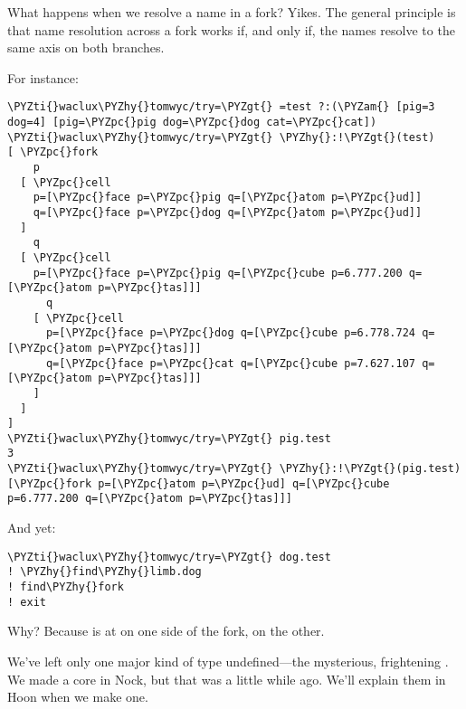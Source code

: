 What happens when we resolve a name in a fork?  Yikes.  The
general principle is that name resolution across a fork works if,
and only if, the names resolve to the same axis on both branches.

For instance:

\begin{framed_shaded}
\begin{Verbatim}[fontsize=\relsize{-2.5},fontseries=b,commandchars=\\\{\}]
\PYZti{}waclux\PYZhy{}tomwyc/try=\PYZgt{} =test ?:(\PYZam{} [pig=3 dog=4] [pig=\PYZpc{}pig dog=\PYZpc{}dog cat=\PYZpc{}cat])
\PYZti{}waclux\PYZhy{}tomwyc/try=\PYZgt{} \PYZhy{}:!\PYZgt{}(test)
[ \PYZpc{}fork
    p
  [ \PYZpc{}cell
    p=[\PYZpc{}face p=\PYZpc{}pig q=[\PYZpc{}atom p=\PYZpc{}ud]]
    q=[\PYZpc{}face p=\PYZpc{}dog q=[\PYZpc{}atom p=\PYZpc{}ud]]
  ]
    q
  [ \PYZpc{}cell
    p=[\PYZpc{}face p=\PYZpc{}pig q=[\PYZpc{}cube p=6.777.200 q=[\PYZpc{}atom p=\PYZpc{}tas]]]
      q
    [ \PYZpc{}cell
      p=[\PYZpc{}face p=\PYZpc{}dog q=[\PYZpc{}cube p=6.778.724 q=[\PYZpc{}atom p=\PYZpc{}tas]]]
      q=[\PYZpc{}face p=\PYZpc{}cat q=[\PYZpc{}cube p=7.627.107 q=[\PYZpc{}atom p=\PYZpc{}tas]]]
    ]
  ]
]
\PYZti{}waclux\PYZhy{}tomwyc/try=\PYZgt{} pig.test
3
\PYZti{}waclux\PYZhy{}tomwyc/try=\PYZgt{} \PYZhy{}:!\PYZgt{}(pig.test)
[\PYZpc{}fork p=[\PYZpc{}atom p=\PYZpc{}ud] q=[\PYZpc{}cube p=6.777.200 q=[\PYZpc{}atom p=\PYZpc{}tas]]]
\end{Verbatim}
\end{framed_shaded}
And yet:

\begin{framed_shaded}
\begin{Verbatim}[fontsize=\relsize{-2.5},fontseries=b,commandchars=\\\{\}]
\PYZti{}waclux\PYZhy{}tomwyc/try=\PYZgt{} dog.test
! \PYZhy{}find\PYZhy{}limb.dog
! find\PYZhy{}fork
! exit
\end{Verbatim}
\end{framed_shaded}
Why?  Because  is at  on one side of the fork,  on
the other.

We've left only one major kind of type undefined---the
mysterious, frightening .  We made a core in Nock, but
that was a little while ago.  We'll explain them in Hoon when we
make one.